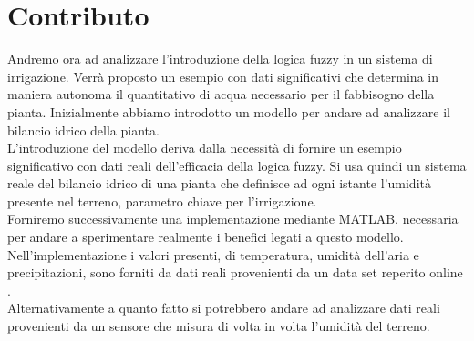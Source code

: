 \documentclass[conference,10pt]{IEEEtran}
\begin{document}
\section{Contributo}\label{sec:symo}
Andremo ora ad analizzare l'introduzione della logica fuzzy in un sistema di irrigazione. Verrà proposto un esempio con dati significativi che determina in maniera autonoma il quantitativo di acqua necessario per il fabbisogno della pianta.
Inizialmente abbiamo introdotto un modello per andare ad analizzare il bilancio idrico della pianta.\\
L'introduzione del modello deriva dalla necessità di fornire un esempio significativo con dati reali dell'efficacia della logica fuzzy. Si usa quindi un sistema reale del bilancio idrico di una pianta che definisce ad ogni istante l'umidità presente nel terreno, parametro chiave per l'irrigazione.\\
Forniremo successivamente una implementazione mediante MATLAB, necessaria per andare a sperimentare realmente i benefici legati a questo modello.\\
Nell'implementazione i valori presenti, di temperatura, umidità dell'aria e precipitazioni, sono forniti da dati reali provenienti da un data set reperito online \cite{7}. \\
Alternativamente a quanto fatto si potrebbero andare ad analizzare dati reali provenienti da un sensore che misura di volta in volta l'umidità del terreno.

\end{document}
